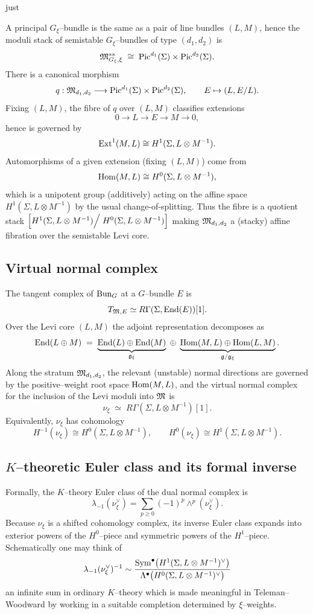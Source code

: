 just \documentclass[12pt]{article}
\begin{document}
A principal $G_\xi$--bundle is the same as a pair of line bundles $(L,M)$, hence
the moduli stack of semistable $G_\xi$--bundles of type $(d_1,d_2)$ is
\[
\mathfrak{M}^{ss}_{G_\xi,\xi}\;\cong\;\operatorname{Pic}^{d_1}(\Sigma)\times \operatorname{Pic}^{d_2}(\Sigma).
\]
There is a canonical morphism
\[
q:\mathfrak{M}_{d_1,d_2}\longrightarrow \operatorname{Pic}^{d_1}(\Sigma)\times \operatorname{Pic}^{d_2}(\Sigma),
\qquad E\mapsto (L,E/L).
\]
Fixing $(L,M)$, the fibre of $q$ over $(L,M)$ classifies extensions
\[
0\to L\to E\to M\to 0,
\]
hence is governed by
\[
\operatorname{Ext}^1(M,L)\cong H^1(\Sigma,L\otimes M^{-1}).
\]
Automorphisms of a given extension (fixing $(L,M)$) come from
\[
\operatorname{Hom}(M,L)\cong H^0(\Sigma,L\otimes M^{-1}),
\]
which is a unipotent group (additively) acting on the affine space
$H^1(\Sigma,L\otimes M^{-1})$ by the usual change-of-splitting.
Thus the fibre is a quotient stack
$\Bigl[H^1(\Sigma,L\otimes M^{-1})\Big/\;H^0(\Sigma,L\otimes M^{-1})\Bigr]$
making $\mathfrak{M}_{d_1,d_2}$ a (stacky) affine fibration over the semistable Levi core.

\subsection{Virtual normal complex}

The tangent complex of $\operatorname{Bun}_G$ at a $G$--bundle $E$ is
\[
T_{\mathfrak{M},E}\simeq R\Gamma(\Sigma,\operatorname{End}(E))[1].
\]
Over the Levi core $(L,M)$ the adjoint representation decomposes as
\[
\operatorname{End}(L\oplus M)
\;=\;
\underbrace{\operatorname{End}(L)\oplus\operatorname{End}(M)}_{\mathfrak{g}_\xi}
\;\oplus\;
\underbrace{\operatorname{Hom}(M,L)\oplus \operatorname{Hom}(L,M)}_{\mathfrak{g}/\mathfrak{g}_\xi}.
\]
Along the stratum $\mathfrak{M}_{d_1,d_2}$, the relevant (unstable) normal directions
are governed by the positive--weight root space $\operatorname{Hom}(M,L)$, and the virtual normal
complex for the inclusion of the Levi moduli into $\mathfrak{M}$ is
\[
\nu_\xi \;\simeq\; R\Gamma(\Sigma, L\otimes M^{-1})[1].
\]
Equivalently, $\nu_\xi$ has cohomology
\[
H^{-1}(\nu_\xi)\cong H^0(\Sigma,L\otimes M^{-1}),
\qquad
H^0(\nu_\xi)\cong H^1(\Sigma,L\otimes M^{-1}).
\]

\subsection{$K$--theoretic Euler class and its formal inverse}

Formally, the $K$--theory Euler class of the dual normal complex is
\[
\lambda_{-1}(\nu_\xi^\vee)
=\sum_{p\ge 0}(-1)^p\wedge^p(\nu_\xi^\vee).
\]
Because $\nu_\xi$ is a shifted cohomology complex, its inverse Euler class
expands into exterior powers of the $H^0$--piece and symmetric powers of the
$H^1$--piece.  Schematically one may think of
\[
\lambda_{-1}(\nu_\xi^\vee)^{-1}
\sim
\frac{\operatorname{Sym}^\bullet\bigl(H^1(\Sigma,L\otimes M^{-1})^\vee\bigr)}
{\Lambda^\bullet\bigl(H^0(\Sigma,L\otimes M^{-1})^\vee\bigr)}
\]
an infinite sum in ordinary $K$--theory which is made meaningful in
Teleman--Woodward by working in a suitable completion determined by $\xi$--weights.
\end{document}
